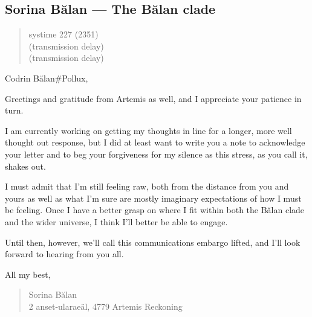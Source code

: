 \hypertarget{sorina-bux103lan-the-bux103lan-clade}{%
\subsection{Sorina Bălan — The Bălan clade}\label{sorina-bux103lan-the-bux103lan-clade}}

\begin{quote}
systime 227 (2351)\\
(transmission delay)\\
(transmission delay)
\end{quote}

Codrin Bălan\#Pollux,

Greetings and gratitude from Artemis as well, and I appreciate your patience in turn.

I am currently working on getting my thoughts in line for a longer, more well thought out response, but I did at least want to write you a note to acknowledge your letter and to beg your forgiveness for my silence as this stress, as you call it, shakes out.

I must admit that I'm still feeling raw, both from the distance from you and yours as well as what I'm sure are mostly imaginary expectations of how I must be feeling. Once I have a better grasp on where I fit within both the Bălan clade and the wider universe, I think I'll better be able to engage.

Until then, however, we'll call this communications embargo lifted, and I'll look forward to hearing from you all.

All my best,

\begin{quote}
Sorina Bălan\\
2 anset-ularaeäl, 4779 Artemis Reckoning
\end{quote}
